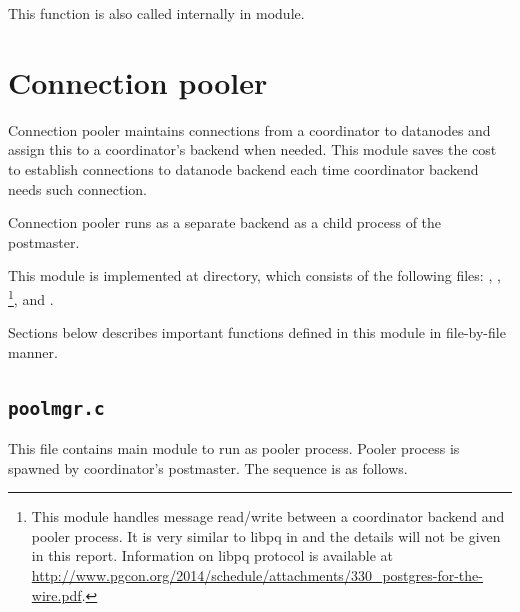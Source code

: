       This function is also called internally in  module.



\section{\label{sec:pooler}Connection pooler}

  Connection pooler maintains connections from a coordinator to datanodes and assign this
  to a coordinator's backend when needed.
  This module saves the cost to establish connections to datanode backend each time
  coordinator backend needs such connection.
  
  Connection pooler runs as a separate backend as a child process of the postmaster.
  
  This module is implemented at  directory, which consists of
  the following files: , , 
  \footnote{
	  	This module handles message read/write between a coordinator backend and pooler process.
		It is very similar to libpq in \PG{} and the details will not be given in this report.
		Information on libpq protocol is available at
		\url{http://www.pgcon.org/2014/schedule/attachments/330_postgres-for-the-wire.pdf}.
  },  and .
  
  Sections below describes important functions defined in this module in
  file-by-file manner.



  \subsection{\texttt{poolmgr.c}}
  
  This file contains main module to run as pooler process.
  Pooler process is spawned by coordinator's postmaster.
  The sequence is as follows.
  
